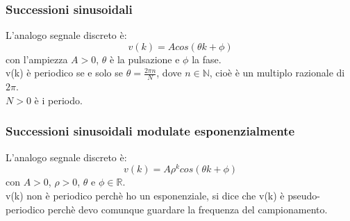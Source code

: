 \subsubsection{Successioni sinusoidali}

	L'analogo segnale discreto è:
	\begin{equation*}
	v(k)= Acos( \theta k + \phi)
	\end{equation*}
	con l'ampiezza $ A>0 $, $ \theta $ è la pulsazione e $ \phi$ la fase.\\
	
	v(k) è periodico se e solo se $ \theta = \frac{2 \pi n}{N}$, dove $n \in \mathbb{N} $, cioè è un multiplo razionale di $ 2 \pi $.\\
	$ N>0 $ è i periodo.\\
	

\subsubsection{Successioni sinusoidali modulate esponenzialmente}

	L'analogo segnale discreto è:
	\begin{equation*}
	v(k)= A \rho^k cos( \theta k + \phi)
	\end{equation*}
	con $ A>0 $, $ \rho>0 $, $ \theta$ e $\phi \in \mathbb{R}$.\\
	
	v(k) non è periodico perchè ho un esponenziale, si dice che v(k) è pseudo-periodico perchè devo comunque guardare la frequenza del campionamento.










